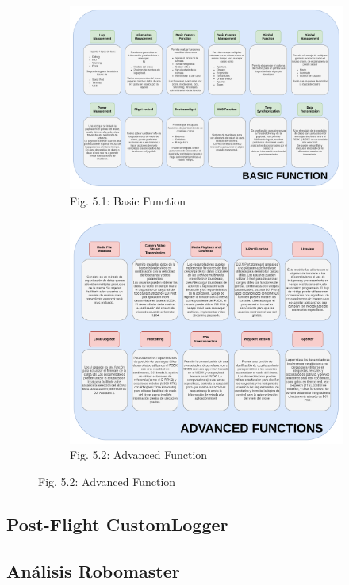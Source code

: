 \documentclass[12pt]{article}
\begin{document}
\begin{figure}[ht]
  \centering
  \begin{subfigure}[b]{0.65\linewidth}
    \includegraphics[width=\linewidth]{images/basic_function.png}
    \caption{Fig. 5.1: Basic Function}
  \end{subfigure}
  \begin{subfigure}[b]{0.65\linewidth}
    \includegraphics[width=\linewidth]{images/advanced_function.png}
    \caption{Fig. 5.2: Advanced Function}
  \end{subfigure}
\end{figure}

\subsection{Post-Flight CustomLogger}

\subsection{Análisis Robomaster}
\end{document}
